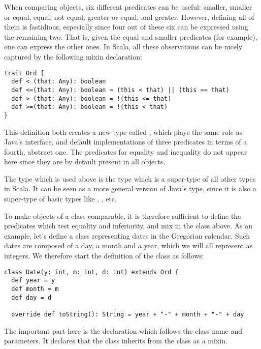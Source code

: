 \documentclass[a4paper,12pt,twoside,titlepage]{article}
\newcommand{\langname}[1]{#1\xspace}
\newcommand{\Scala}{\langname{Scala}}
\newcommand{\Java}{\langname{Java}}
\begin{document}
When comparing objects, six different predicates can be useful:
smaller, smaller or equal, equal, not equal, greater or equal, and
greater. However, defining all of them is fastidious, especially since
four out of these six can be expressed using the remaining two. That
is, given the equal and smaller predicates (for example), one can
express the other ones. In \Scala, all these observations can be
nicely captured by the following mixin declaration:
\begin{lstlisting}
trait Ord {
  def < (that: Any): boolean
  def <=(that: Any): boolean = (this < that) || (this == that)
  def > (that: Any): boolean = !(this <= that)
  def >=(that: Any): boolean = !(this < that)
} 
\end{lstlisting}
This definition both creates a new type called , which
plays the same role as \Java's  interface, and
default implementations of three predicates in terms of a fourth,
abstract one. The predicates for equality and inequality do not appear
here since they are by default present in all objects.

The type  which is used above is the type which is a
super-type of all other types in \Scala. It can be seen as a more
general version of \Java's  type, since it is also a
super-type of basic types like , , etc.

To make objects of a class comparable, it is therefore sufficient to
define the predicates which test equality and inferiority, and mix in
the  class above. As an example, let's define a
 class representing dates in the Gregorian calendar. Such
dates are composed of a day, a month and a year, which we will all
represent as integers. We therefore start the definition of the
 class as follows:
\begin{lstlisting}
class Date(y: int, m: int, d: int) extends Ord {
  def year = y
  def month = m
  def day = d

  override def toString(): String = year + "-" + month + "-" + day
\end{lstlisting}
The important part here is the  declaration which
follows the class name and parameters. It declares that the
 class inherits from the  class as a mixin.
\end{document}
